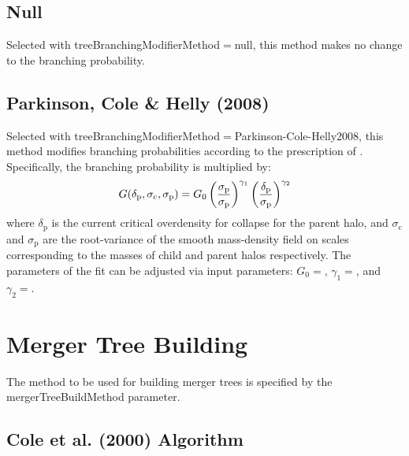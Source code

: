 \subsection{Null}

Selected with {\normalfont \ttfamily treeBranchingModifierMethod}$=${\normalfont \ttfamily null}, this method makes no change to the branching probability.

\subsection{Parkinson, Cole \& Helly (2008)}

Selected with {\normalfont \ttfamily treeBranchingModifierMethod}$=${\normalfont \ttfamily Parkinson-Cole-Helly2008}, this method modifies branching probabilities according to the prescription of \cite{parkinson_generating_2008}. Specifically, the branching probability is multiplied by:
\begin{equation}
 G(\delta_{\mathrm p},\sigma_{\mathrm c},\sigma_{\mathrm p}) = G_0 \left({\sigma_{\mathrm p}\over\sigma_{\mathrm p}}\right)^{\gamma_1} \left({\delta_{\mathrm p}\over\sigma_{\mathrm p}}\right)^{\gamma_2}
\end{equation}
where $\delta_{\mathrm p}$ is the current critical overdensity for collapse for the parent halo, and $\sigma_{\mathrm c}$ and $\sigma_{\mathrm p}$ are the root-variance of the smooth mass-density field on scales corresponding to the masses of child and parent halos respectively. The parameters of the fit can be adjusted via input parameters: $G_0=${\normalfont \ttfamily [modifiedPressSchechterG0]}, $\gamma_1=${\normalfont \ttfamily [modifiedPressSchechterGamma1]}, and $\gamma_2=${\normalfont \ttfamily [modifiedPressSchechterGamma2]}.

\section{Merger Tree Building}

The method to be used for building merger trees is specified by the {\normalfont \ttfamily mergerTreeBuildMethod} parameter.

\subsection{Cole et al. (2000) Algorithm}


